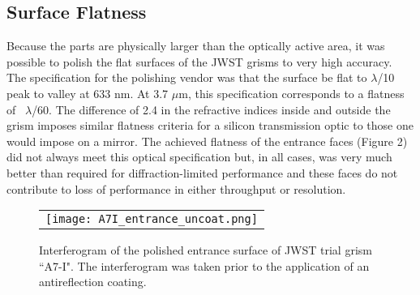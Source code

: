 \subsection{Surface Flatness}
Because the parts are physically larger than the optically active area, it was possible to polish the flat surfaces of the JWST grisms to very high accuracy.  The specification for the polishing vendor was that the surface be flat to $\lambda$/10 peak to valley at 633 nm.  At 3.7 $\mu$m, this specification corresponds to a flatness of ~$\lambda$/60.  The difference of 2.4 in the refractive indices inside and outside the grism imposes similar flatness criteria for a silicon transmission optic to those one would impose on a mirror.  The achieved flatness of the entrance faces (Figure 2) did not always meet this optical specification but, in all cases, was very much better than required for diffraction-limited performance and these faces do not contribute to loss of performance in either throughput or resolution.  


   \begin{figure}
   \begin{center}
   \begin{tabular}{c}
   \texttt{[image: A7I\_entrance\_uncoat.png]}
   \end{tabular}
   \end{center}
   \caption[A7-I interferogram] {\label{fig:im2}  Interferogram of the polished entrance surface of JWST trial grism ``A7-I".  The interferogram was taken prior to the application of an antireflection coating. }
   \end{figure} 


